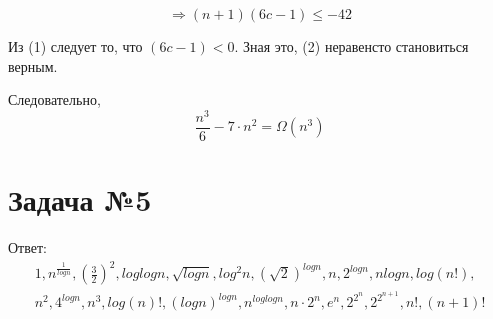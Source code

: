 \documentclass{article}
\begin{document}
\begin{equation}
    \Rightarrow
    (n+1)(6c-1) \leq -42
\end{equation}

Из (1) следует то, что $(6c - 1) < 0$. Зная это, (2) неравенсто становиться верным.

Следовательно, 
\begin{equation*}
    \frac{n^3}{6} - 7\cdot n^2 = \Omega(n^3)
\end{equation*}

\section{Задача №5}
    Ответ: 
    \begin{align*}
        1,n^{\frac{1}{logn}}, (\frac{3}{2})^2, loglogn, \sqrt{logn}, log^2n, (\sqrt{2})^{logn}, n, 2^{logn}, nlogn, log(n!),\\
        n^2, 4^{logn}, n^3, log(n)!, (logn)^{logn}, n^{loglogn}, n\cdot 2^n ,e^n, 2^{2^n}, 2^{2^{n + 1}},  n!, (n+1)!
    \end{align*}
\end{document}

